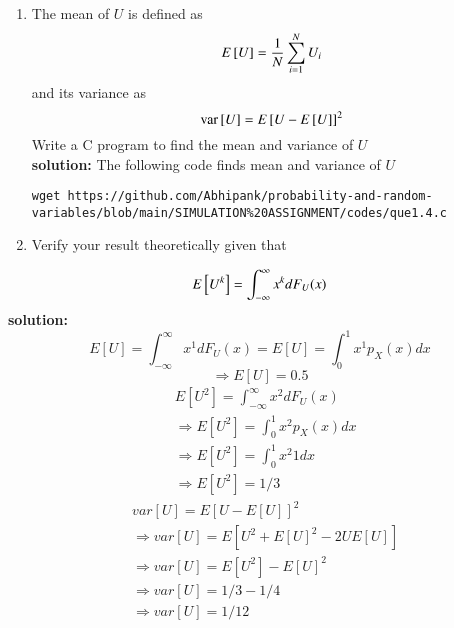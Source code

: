 \documentclass[journal,12pt,twocolumn]{IEEEtran}
\renewcommand\thesection{\arabic{section}}
\begin{document}
\begin{enumerate}[label=\thesection.\arabic*
,ref=\thesection.\theenumi]
\item
The mean of $U$ is defined as
%
\begin{equation}
E{}\left[U\right] = \frac{1}{N}\sum_{i=1}^{N}U_i
\end{equation}
%
and its variance as
%
\begin{equation}
\text{var}{}\left[U\right] = E{}\left[U- E{}\left[U\right]\right]^2 
\end{equation}
Write a C program to  find the mean and variance of $U$\\
\textbf{solution:}  The following code finds mean and variance of $U$ 
\begin{lstlisting}
wget https://github.com/Abhipank/probability-and-random-variables/blob/main/SIMULATION%20ASSIGNMENT/codes/que1.4.c
\end{lstlisting}

\item Verify your result theoretically given that
\end{enumerate}
%
\begin{equation}
E{}\left[U^k\right] = \int_{-\infty}^{\infty}x^kdF_{U}(x)
\end{equation}
\textbf{solution:}
\begin{equation}
E[U] = \int_{-\infty}^{\infty}x^1dF_{U}(x)
= E[U]=\int_{0}^{1}x^1p_X(x) dx \nonumber
\end{equation}
\begin{equation}
\Rightarrow E[U] =0.5 \nonumber
\end{equation}
\begin{align}
    &E[U^{2}]=\int_{-\infty}^{\infty}x^2dF_{U}(x)\nonumber\\
    &\Rightarrow E[U^{2}]=\int_{0}^{1}x^2 p_X(x) dx\nonumber\\
    &\Rightarrow E[U^{2}]=\int_{0}^{1}x^2 1 dx\nonumber\\
    &\Rightarrow E[U^{2}]=1/3\nonumber
\end{align}
\begin{align}
 &var[U]=E[U-E[U]]^{2}\\
 &\Rightarrow var[U]=E[U^{2}+E[U]^{2}-2UE[U]] \nonumber\\
 &\Rightarrow var[U]=E[U^{2}]-E[U]^{2} \nonumber\\
 &\Rightarrow var[U]=1/3 -1/4 \nonumber\\
 &\Rightarrow var[U]=1/12 \nonumber
\end{align}
\end{document}
